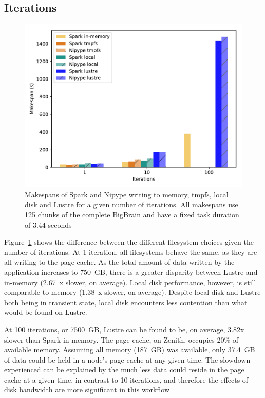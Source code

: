 \documentclass{IEEEtran}
\begin{document}
\subsection{Iterations}
\begin{figure}[h]
    \centering
    \includegraphics[width=\linewidth]{results/figures/iterations.pdf}
    \caption{Makespans of Spark and Nipype writing to memory, tmpfs, local 
             disk and Lustre for a given number of iterations. All 
             makespans use 125 chunks of the complete BigBrain and have a fixed
             task duration of 3.44 seconds}\label{fig:iterations}
\end{figure}


Figure~\ref{fig:iterations} shows the difference between the different 
filesystem choices given the number of iterations. At 1 iteration, all 
filesystems behave the same, as they are all writing to the page cache. As the 
total amount of data written by the application increases to 750~GB, there is a 
greater disparity between Lustre and in-memory (2.67~x slower, on average). 
Local disk performance, however, 
is still comparable to memory (1.38~x slower, on average). Despite local disk and 
Lustre both being in transient state, local disk encounters less contention 
than what would be found on Lustre. 



At 100 iterations, or 7500~GB, Lustre can be found to be, on average, 3.82x 
slower than Spark in-memory. The page cache, on Zenith, occupies 20\% of 
available memory. Assuming all memory (187~GB) was available, only 37.4~GB of 
data could be held in a node's page cache at any given time. The slowdown 
experienced can be explained by the much less data could reside in the page 
cache at a given time, in contrast to 10 iterations, and therefore the effects 
of disk bandwidth are more significant in this workflow
\end{document}
